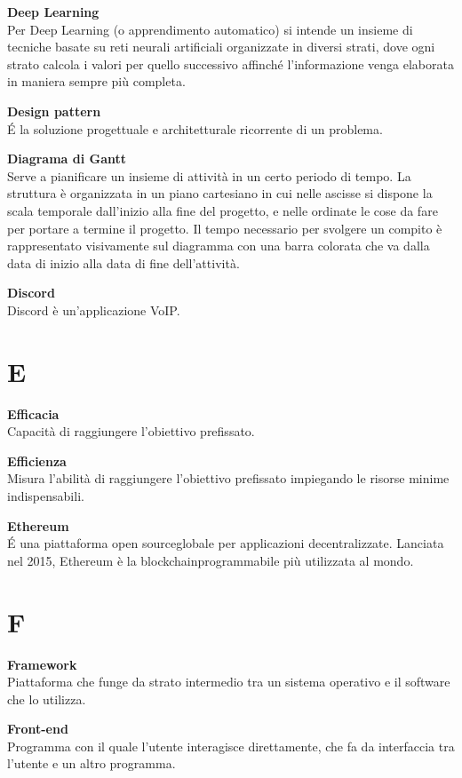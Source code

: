 \documentclass[a4paper, oneside, openany, dvipsnames, table, 12pt]{article}
\begin{document}
\textbf{Deep Learning} \\
Per Deep Learning (o apprendimento automatico) si intende un insieme di tecniche basate su reti neurali artificiali organizzate in diversi strati, dove ogni strato calcola i valori per quello successivo affinché l'informazione venga elaborata in maniera sempre più completa.

\textbf{Design pattern} \\
\'E la soluzione progettuale e architetturale ricorrente di un problema.

\textbf{Diagrama di Gantt} \\
Serve a pianificare un insieme di attività in un certo periodo di tempo. La struttura è organizzata in un piano cartesiano in cui nelle ascisse si dispone la scala temporale dall’inizio alla fine del progetto, e nelle ordinate le cose da fare per portare a termine il progetto. Il tempo necessario per svolgere un compito è rappresentato visivamente sul diagramma con una barra colorata che va dalla data di inizio alla data di fine dell’attività.

\textbf{Discord} \\
Discord è un'applicazione VoIP\glo.

\newpage
\section{E}
\textbf{Efficacia} \\
Capacità di raggiungere l'obiettivo prefissato.

\textbf{Efficienza} \\
Misura l'abilità di raggiungere l'obiettivo prefissato impiegando le risorse minime indispensabili.

\textbf{Ethereum} \\
\'E una piattaforma open source\glo globale per applicazioni decentralizzate. Lanciata nel 2015, Ethereum è la blockchain\glo programmabile più utilizzata al mondo.

\newpage
\section{F}
\textbf{Framework} \\
Piattaforma che funge da strato intermedio tra un sistema operativo e il software che lo utilizza.

\label{par:frontend}
\textbf{Front-end} \\
Programma con il quale l’utente interagisce direttamente, che fa da interfaccia tra l’utente e un altro programma.
\end{document}
